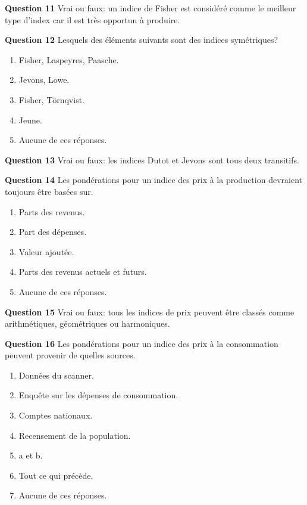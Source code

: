 \documentclass[]{article}
\begin{document}
\textbf{Question 11} Vrai ou faux: un indice de Fisher est considéré comme le meilleur type d'index car il est très opportun à produire.

\textbf{Question 12} Lesquels des éléments suivants sont des indices symétriques?

\begin{enumerate}
\def\labelenumi{\alph{enumi})}
\item
  Fisher, Laspeyres, Paasche.
\item
  Jevons, Lowe.
\item
  Fisher, Törnqvist.
\item
  Jeune.
\item
  Aucune de ces réponses.
\end{enumerate}

\textbf{Question 13} Vrai ou faux: les indices Dutot et Jevons sont tous deux transitifs.

\textbf{Question 14} Les pondérations pour un indice des prix à la production devraient toujours être basées sur.

\begin{enumerate}
\def\labelenumi{\alph{enumi})}
\item
  Parts des revenus.
\item
  Part des dépenses.
\item
  Valeur ajoutée.
\item
  Parts des revenus actuels et futurs.
\item
  Aucune de ces réponses.
\end{enumerate}

\textbf{Question 15} Vrai ou faux: tous les indices de prix peuvent être classés comme arithmétiques, géométriques ou harmoniques.

\textbf{Question 16} Les pondérations pour un indice des prix à la consommation peuvent provenir de quelles sources.

\begin{enumerate}
\def\labelenumi{\alph{enumi})}
\item
  Données du scanner.
\item
  Enquête sur les dépenses de consommation.
\item
  Comptes nationaux.
\item
  Recensement de la population.
\item
  a et b.
\item
  Tout ce qui précède.
\item
  Aucune de ces réponses.
\end{enumerate}
\end{document}
